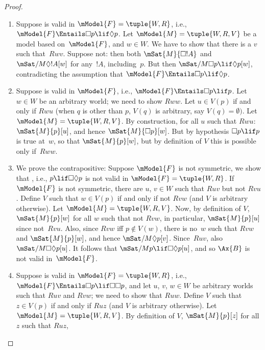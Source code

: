 \documentclass[../../../include/open-logic-section]{subfiles}
\begin{document}
\begin{proof}
  \begin{enumerate}
  \item Suppose  is valid in $\mModel{F} = \tuple{W, R}$, i.e.,
    $\mModel{F} \Entails \Box p \lif \Diamond p$. Let $\mModel{M} =
    \tuple{W, R, V}$ be a model based on~$\mModel{F}$, and $w \in
    W$. We have to show that there is a $v$ such that~$Rwv$.  Suppose
    not: then both $\mSat{M}{\Box !A}$ and $\mSat/{M}{\Diamond !A}[w]$
    for any~$!A$, including~$p$. But then $\mSat/{M}{\Box p \lif
      \Diamond p}[w]$, contradicting the assumption that $\mModel{F}
    \Entails \Box p \lif \Diamond p$.
  \item Suppose  is valid in $\mModel{F}$, i.e., $\mModel{F} \Entails \Box
    p \lif p$. Let $w \in W$ be an arbitrary world; we need to show
    $Rww$. Let $u \in V(p)$ if and only if $Rwu$ (when $q$ is other
    than $p$, $V(q)$ is arbitrary, say $V(q) = \emptyset)$. Let
    $\mModel{M} = \tuple{W, R, V}$. By construction, for all $u$ such
    that $Rwu$: $\mSat{M}{p}[u]$, and hence $\mSat{M}{\Box p}[w]$. But
    by hypothesis $\Box p \lif p$ is true at~$w$, so that
    $\mSat{M}{p}[w]$, but by definition of $V$ this is possible only
    if~$Rww$.
  \item We prove the contrapositive: Suppose $\mModel{F}$ is not
    symmetric, we show that , i.e., $p \lif \Box\Diamond p$ is
    not valid in $\mModel{F}= \tuple{W, R}$. If $\mModel{F}$ is not
    symmetric, there are $u$, $v \in W$ such that $Ruv$ but not
    $Rvu$. Define $V$ such that $w \in V(p)$ if and only if not $Rvw$
    (and $V$ is arbitrary otherwise). Let $\mModel{M} =\tuple{W, R,
      V}$.  Now, by definition of $V$, $\mSat{M}{p}[w]$ for all $w$
    such that not $Rvw$, in particular, $\mSat{M}{p}[u]$ since
    not~$Rvu$. Also, since $Rvw$ iff $p \notin V(w)$, there is no~$w$
    such that $Rvw$ and $\mSat{M}{p}[w]$, and hence
    $\mSat/{M}{\Diamond p}[v]$. Since~$Ruv$, also
    $\mSat/{M}{\Box\Diamond p}[u]$. It follows that $\mSat/{M}{p \lif
      \Box\Diamond p}[u]$, and so $\Ax{B}$ is not valid
    in~$\mModel{F}$.
  \item Suppose  is valid in $\mModel{F} = \tuple{W,R}$, i.e.,
    $\mModel{F} \Entails \Box p \lif \Box\Box p$, and let $u$, $v$, $w \in W$ be
    arbitrary worlds such that $Ruv$ and $Rvw$; we need to show that
    $Ruw$. Define $V$ such that $z \in V(p)$ if and only if $Ruz$ (and
    $V$ is arbitrary otherwise). Let $\mModel{M} =\tuple{W, R, V}$. By
    definition of $V$, $\mSat{M}{p}[z]$ for all $z$ such that $Ruz$,

\end{enumerate}
\end{proof}
\end{document}
